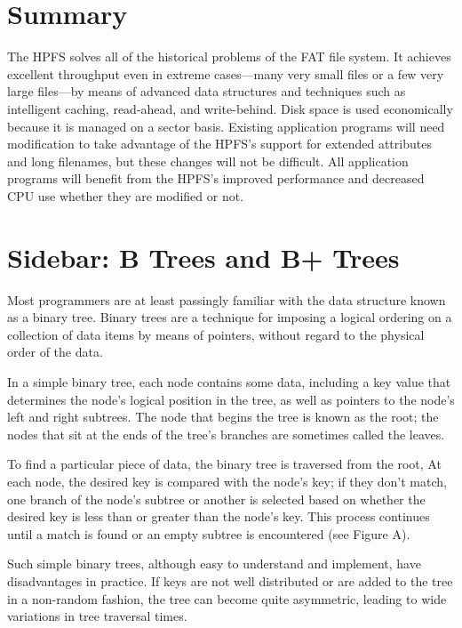 \section{\heads Summary}
 
The HPFS solves all of the historical problems of the FAT file system. It
achieves excellent throughput even in extreme cases---many very small files or
a few very large files---by means of advanced data structures and techniques
such as intelligent caching, read-ahead, and write-behind. Disk space is used
economically because it is managed on a sector basis.  Existing application
programs will need modification to take advantage of the HPFS's support for
extended attributes and long filenames, but these changes will not be
difficult.  All application programs will benefit from the HPFS's improved
performance and decreased CPU use whether they are modified or not.
 
 
\section*{\heads Sidebar: B  Trees and B+ Trees}
 
Most programmers are at least passingly familiar with the data structure
known as a binary tree.  Binary trees are a technique for imposing a logical
ordering on a collection of data items by means of pointers, without regard
to the physical order of the data.
 
In a simple binary tree, each node contains some data, including a key value
that determines the node's logical position in the tree, as well as pointers
to the node's left and right subtrees. The node that begins the tree is known
as the root; the nodes that sit at the ends of the tree's branches are
sometimes called the leaves.
 
To find a particular piece of data, the binary tree is traversed from the
root, At each node, the desired key is compared with the node's key; if they
don't match, one branch of the node's subtree or another is selected based on
whether the desired key is less than or greater than the node's key.  This
process continues until a match is found or an empty subtree is encountered
(see Figure A).
 
Such simple binary trees, although easy to understand and implement, have
disadvantages in practice.  If keys are not well distributed or are added to
the tree in a non-random fashion, the tree can become quite asymmetric,
leading to wide variations in tree traversal times.
 
